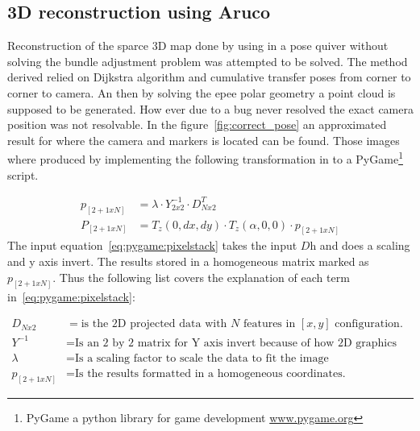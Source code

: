 \subsection{3D reconstruction using Aruco}%
Reconstruction of the sparce 3D map done by using  in a pose quiver without solving the bundle adjustment problem was attempted to be solved.
The method derived relied on Dijkstra algorithm and cumulative transfer poses from corner to corner to camera.
An then by solving the epee polar geometry a point cloud is supposed to be generated.
How ever due to a bug never resolved the exact camera position was not resolvable.
In the figure~\ref{fig:correct_pose} an approximated result for where the camera and \aruco{ } markers is located can be found.
Those images where produced by implementing the following transformation in to a PyGame\footnote{PyGame a python library for game development \url{www.pygame.org}} script.


\begin{align}
    p_{[2+1xN]} & = \lambda \cdot Y^{-1}_{2x2}\cdot D^{T}_{Nx2} \label{eq:pygame:pixelstack}\\
    P_{[2+1xN]} & = T_{z}(0,dx,dy) \cdot T_{z}(\alpha,0,0) \cdot p_{[2+1xN]} \label{eq:pygame:tf}
\end{align}
The input equation~\ref{eq:pygame:pixelstack} takes the input $D$h and does a scaling and y axis invert.
The results stored in a homogeneous matrix marked as $p_{[2+1xN]}$.
Thus the following list covers the explanation of each term in~\ref{eq:pygame:pixelstack}:


\begin{align*}
    D_{Nx2}   &=       \text{is the 2D projected data with $N$ features in $[x,y]$ configuration.}\\
    Y^{-1}    &=       \text{Is an 2 by 2 matrix for Y axis invert because of how 2D graphics works.}\\
    \lambda   &=      \text{Is a scaling factor to scale the data to fit the image}\\
    p_{[2+1xN]} &=      \text{Is the results formatted in a homogeneous coordinates.}
\end{align*}

